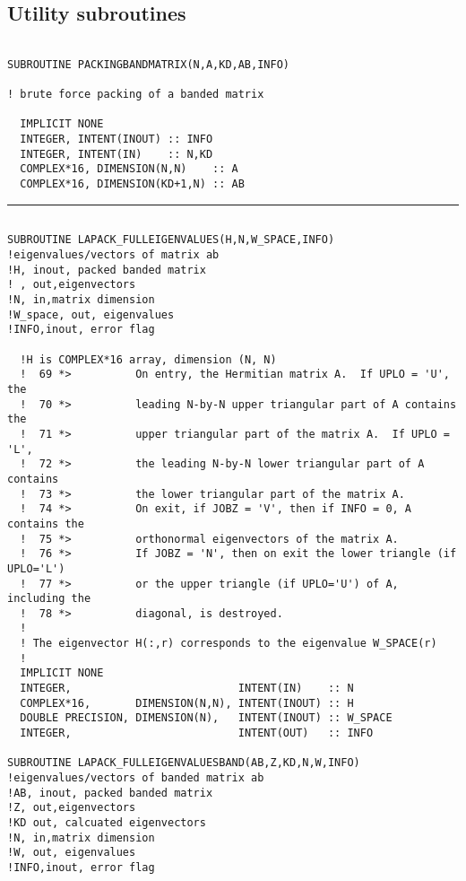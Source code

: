 \documentclass[10pt,a4paper]{article}
\begin{document}
\subsection{Utility subroutines}
\begin{verbatim}

SUBROUTINE PACKINGBANDMATRIX(N,A,KD,AB,INFO)

! brute force packing of a banded matrix
  
  IMPLICIT NONE
  INTEGER, INTENT(INOUT) :: INFO
  INTEGER, INTENT(IN)    :: N,KD
  COMPLEX*16, DIMENSION(N,N)    :: A
  COMPLEX*16, DIMENSION(KD+1,N) :: AB
\end{verbatim}
\begin{center}
\rule{12cm}{1pt}
\end{center}
\begin{verbatim}

SUBROUTINE LAPACK_FULLEIGENVALUES(H,N,W_SPACE,INFO)
!eigenvalues/vectors of matrix ab
!H, inout, packed banded matrix
! , out,eigenvectors
!N, in,matrix dimension
!W_space, out, eigenvalues
!INFO,inout, error flag

  !H is COMPLEX*16 array, dimension (N, N)
  !  69 *>          On entry, the Hermitian matrix A.  If UPLO = 'U', the
  !  70 *>          leading N-by-N upper triangular part of A contains the
  !  71 *>          upper triangular part of the matrix A.  If UPLO = 'L',
  !  72 *>          the leading N-by-N lower triangular part of A contains
  !  73 *>          the lower triangular part of the matrix A.
  !  74 *>          On exit, if JOBZ = 'V', then if INFO = 0, A contains the
  !  75 *>          orthonormal eigenvectors of the matrix A.
  !  76 *>          If JOBZ = 'N', then on exit the lower triangle (if UPLO='L')
  !  77 *>          or the upper triangle (if UPLO='U') of A, including the
  !  78 *>          diagonal, is destroyed.
  !
  ! The eigenvector H(:,r) corresponds to the eigenvalue W_SPACE(r)
  !
  IMPLICIT NONE
  INTEGER,                          INTENT(IN)    :: N
  COMPLEX*16,       DIMENSION(N,N), INTENT(INOUT) :: H
  DOUBLE PRECISION, DIMENSION(N),   INTENT(INOUT) :: W_SPACE
  INTEGER,                          INTENT(OUT)   :: INFO

SUBROUTINE LAPACK_FULLEIGENVALUESBAND(AB,Z,KD,N,W,INFO)
!eigenvalues/vectors of banded matrix ab
!AB, inout, packed banded matrix
!Z, out,eigenvectors
!KD out, calcuated eigenvectors
!N, in,matrix dimension
!W, out, eigenvalues
!INFO,inout, error flag


\end{verbatim}
\end{document}
